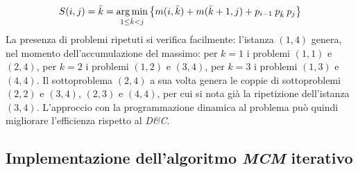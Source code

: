 \begin{equation*}
    S(i,j)
    =
    \bar{k} =
    \displaystyle\operatorname*{arg\,min}_{1 \leq \bar{k} < j}
    \left\{ 
    m(i, \bar{k})
    +
    m(\bar{k}+1,j)
    + p_{i-1} \: p_{\bar{k}} \: p_j
    \right\}
\end{equation*}
La presenza di problemi ripetuti si verifica facilmente: l'istanza $(1,4)$ genera, nel momento dell'accumulazione del massimo:
per $k=1$ i problemi $(1,1)$ e $(2,4)$,
per $k=2$ i problemi $(1,2)$ e $(3,4)$,
per $k=3$ i problemi $(1,3)$ e $(4,4)$.
Il sottoproblema $(2,4)$ a sua volta genera le coppie di sottoproblemi 
$(2,2)$ e $(3,4)$,
$(2,3)$ e $(4,4)$,
per cui si nota già la ripetizione dell'istanza $(3,4)$.
L'approccio con la programmazione dinamica al problema può quindi migliorare l'efficienza rispetto al \emph{D\&C}.

\subsection{Implementazione dell'algoritmo \emph{MCM} iterativo}


